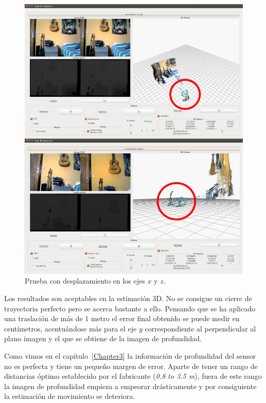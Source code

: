 \begin{figure}[th]
\centering
\includegraphics[scale=0.35]{Figures/tests/axis-x-z.png}
\decoRule
\caption[Prueba con desplazamiento en los ejes $x$ y $z$]{Prueba con desplazamiento en los ejes $x$ y $z$.}
\label{fig:axis-xz}
\end{figure}

Los resultados son aceptables en la estimación 3D. No se consigue un cierre de trayectoria perfecto pero se acerca bastante a ello. Pensando que se ha aplicado una traslación de más de 1 metro el error final obtenido se puede medir en centímetros, acentuándose más para el eje $y$ correspondiente al perpendicular al plano imagen y el que se obtiene de la imagen de profundidad.

Como vimos en el capítulo~\ref{Chapter3} la información de profundidad del sensor no es perfecta y tiene un pequeño margen de error. Aparte de tener un rango de distancias óptimo establecido por el fabricante (\textit{0.8 to 3.5 m}), fuera de este rango la imagen de profundidad empieza a empeorar drásticamente y por consiguiente la estimación de movimiento se deteriora.

